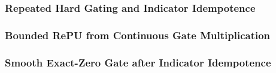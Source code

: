 \documentclass{article}
\begin{document}
%
%
%
%


\subsubsection{Repeated Hard Gating and Indicator Idempotence}
\label{sec:indicator_idempotence}

%
%
%
%
%
%
%


\subsubsection{Bounded RePU from Continuous Gate Multiplication}
\label{sec:normalized_requ}

%
%
%
%
%
%
%
%
%
%
%
%


\subsubsection{Smooth Exact-Zero Gate after Indicator Idempotence}
\label{sec:smooth_step}

%
%
%
%
%
%
%
%
%
%
%
%
%
\end{document}
